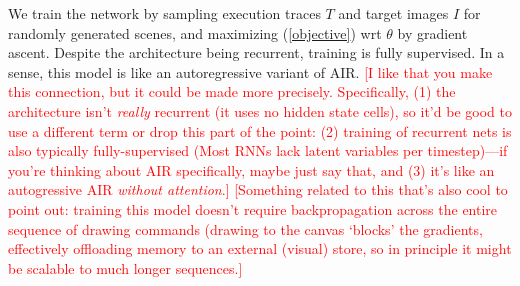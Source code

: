 \documentclass{article}
\newcommand{\remark}[1]{\textcolor{red}{[#1]}}
\begin{document}
We train the network by sampling execution traces $T$ and target
images $I$ for randomly generated scenes, and maximizing
(\ref{objective}) wrt $\theta$ by gradient ascent. Despite the
architecture being recurrent, training is fully supervised. In a
sense, this model is like an autoregressive variant of AIR.
\remark{I like that you make this connection, but it could be made more precisely. Specifically, (1) the architecture isn't \emph{really} recurrent (it uses no hidden state cells), so it'd be good to use a different term or drop this part of the point: (2) training of recurrent nets is also typically fully-supervised (Most RNNs lack latent variables per timestep)---if you're thinking about AIR specifically, maybe just say that, and (3) it's like an autogressive AIR \emph{without attention}.}
\remark{Something related to this that's also cool to point out: training this model doesn't require backpropagation across the entire sequence of drawing commands (drawing to the canvas `blocks' the gradients, effectively offloading memory to an external (visual) store, so in principle it might be scalable to much longer sequences.}

\end{document}

